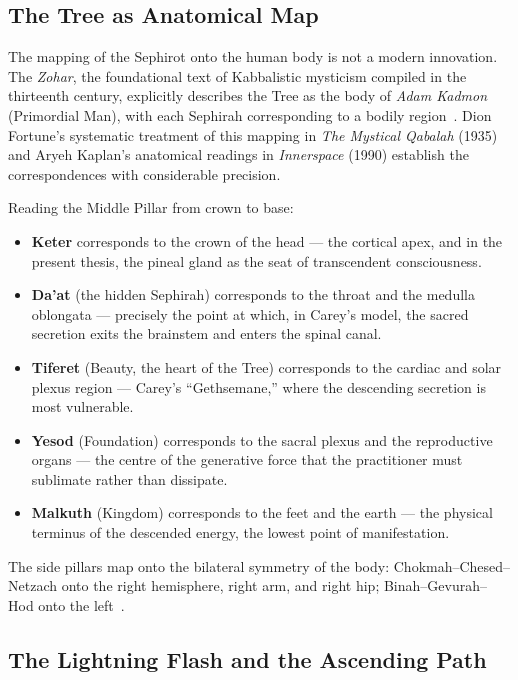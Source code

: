 \documentclass[12pt, a4paper]{article}
\begin{document}
\subsection{The Tree as Anatomical Map}

The mapping of the Sephirot onto the human body is not a modern innovation.
The \emph{Zohar}, the foundational text of Kabbalistic mysticism compiled in
the thirteenth century, explicitly describes the Tree as the body of
\emph{Adam Kadmon} (Primordial Man), with each Sephirah corresponding to a
bodily region~\autocite[143]{zohar2003}. Dion Fortune's systematic treatment
of this mapping in \emph{The Mystical Qabalah} (1935) and Aryeh Kaplan's
anatomical readings in \emph{Innerspace} (1990) establish the correspondences
with considerable precision.

Reading the Middle Pillar from crown to base:

\begin{itemize}
  \item \textbf{Keter} corresponds to the crown of the head — the cortical
  apex, and in the present thesis, the pineal gland as the seat of
  transcendent consciousness.
  \item \textbf{Da'at} (the hidden Sephirah) corresponds to the throat and
  the medulla oblongata — precisely the point at which, in Carey's model, the
  sacred secretion exits the brainstem and enters the spinal canal.
  \item \textbf{Tiferet} (Beauty, the heart of the Tree) corresponds to the
  cardiac and solar plexus region — Carey's ``Gethsemane,'' where the
  descending secretion is most vulnerable.
  \item \textbf{Yesod} (Foundation) corresponds to the sacral plexus and the
  reproductive organs — the centre of the generative force that the practitioner
  must sublimate rather than dissipate.
  \item \textbf{Malkuth} (Kingdom) corresponds to the feet and the earth —
  the physical terminus of the descended energy, the lowest point of
  manifestation.
\end{itemize}

The side pillars map onto the bilateral symmetry of the body: Chokmah--Chesed--Netzach
onto the right hemisphere, right arm, and right hip; Binah--Gevurah--Hod onto
the left~\autocite[87]{fortune1935}.

\subsection{The Lightning Flash and the Ascending Path}
\end{document}

